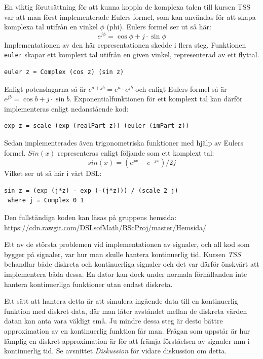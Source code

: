 \documentclass[12pt,a4paper,twoside,openright]{article}
\begin{document}
En viktig förutsättning för att kunna koppla de komplexa talen till
kursen TSS var att man först implementerade Eulers formel, som kan
användas för att skapa komplexa tal utifrån en vinkel \(\phi\)
(phi). Eulers formel ser ut så här:
\[e^{j\phi}=\cos \phi+ j \cdot \sin \phi \]
Implementationen av den här representationen skedde i flera steg.
Funktionen \texttt{euler} skapar ett komplext tal utifrån
en given vinkel, representerad av ett flyttal.
\begin{verbatim}
euler z = Complex (cos z) (sin z)
\end{verbatim}
Enligt potenslagarna %
så är \(e^{a+jb} = e^{a} \cdot e^{jb}\) och enligt Eulers formel så är
\(e^{j b} = \cos b + j\cdot \sin b\).
Exponentialfunktionen för ett komplext tal kan därför implementeras
enligt nedanstående kod:

\begin{verbatim}
exp z = scale (exp (realPart z)) (euler (imPart z))
\end{verbatim}
Sedan implementerades även trigonometriska funktioner med hjälp av
Eulers formel. $Sin(x)$ representeras enligt följande som ett komplext tal:
\[ sin(x) = (e^{j x} - e^{-j x}) / 2 j \]
Vilket ser ut så här i vårt DSL:
\begin{verbatim}
sin z = (exp (j*z) - exp (-(j*z))) / (scale 2 j)
 where j = Complex 0 1
\end{verbatim}

Den fullständiga koden kan läsas på gruppens hemsida:
\url{https://cdn.rawgit.com/DSLsofMath/BScProj/master/Hemsida/}

Ett av de största problemen vid implementationen av signaler, och all
kod som bygger på signaler, var hur man skulle hantera kontinuerlig
tid. Kursen \textit{TSS} behandlar både diskreta och kontinuerliga
signaler och det var därför önskvärt att implementera båda dessa. En
dator kan dock under normala förhållanden inte hantera kontinuerliga
funktioner utan endast diskreta. %

Ett sätt att hantera detta är att simulera ingående data till en
kontinuerlig funktion med diskret data, där man låter avståndet mellan
de diskreta värden datan kan anta vara väldigt små. Ju mindre dessa
steg är desto bättre approximation av en kontinuerlig funktion får
man. Frågan som uppstår är hur lämplig en diskret approximation är för
att främja förståelsen av signaler mm i kontinuerlig tid. Se avsnittet
\textit{Diskussion} för vidare diskussion om detta.
\end{document}
